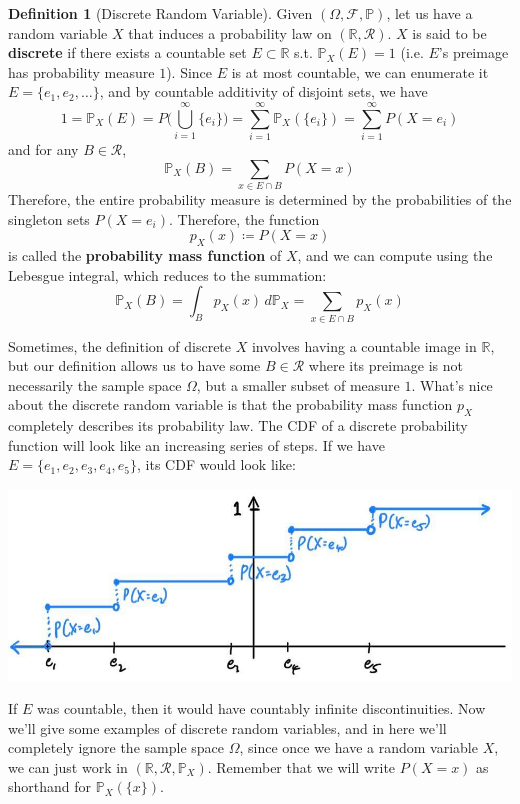 \documentclass{article}
\theoremstyle{definition}
\theoremstyle{remark}
\theoremstyle{definition}
\newtheorem{definition}{Definition}[section]
\begin{document}
\begin{definition}[Discrete Random Variable]
Given $(\Omega, \mathcal{F}, \mathbb{P})$, let us have a random variable $X$ that induces a probability law on $(\mathbb{R}, \mathcal{R})$. $X$ is said to be \textbf{discrete} if there exists a countable set $E \subset \mathbb{R}$ s.t. $\mathbb{P}_X (E) = 1$ (i.e. $E$'s preimage has probability measure $1$). Since $E$ is at most countable, we can enumerate it $E = \{e_1, e_2, \ldots\}$, and by countable additivity of disjoint sets, we have 
\[1 = \mathbb{P}_X (E) = P\bigg( \bigcup_{i=1}^\infty \{e_i\} \bigg) = \sum_{i=1}^\infty \mathbb{P}_X (\{e_i\}) = \sum_{i=1}^\infty P(X = e_i)\]
and for any $B \in \mathcal{R}$,  
\[\mathbb{P}_X (B) = \sum_{x \in E \cap B} P(X = x) \]
Therefore, the entire probability measure is determined by the probabilities of the singleton sets $P(X = e_i)$. Therefore, the function 
\[p_X (x) \coloneqq P(X = x)\]
is called the \textbf{probability mass function} of $X$, and we can compute using the Lebesgue integral, which reduces to the summation: 
\[\mathbb{P}_X (B) = \int_B p_X (x) \, d \mathbb{P}_X = \sum_{x \in E \cap B} p_X (x)\]
\end{definition}

Sometimes, the definition of discrete $X$ involves having a countable image in $\mathbb{R}$, but our definition allows us to have some $B \in \mathcal{R}$ where its preimage is not necessarily the sample space $\Omega$, but a smaller subset of measure $1$. What's nice about the discrete random variable is that the probability mass function $p_X$ completely describes its probability law. The CDF of a discrete probability function will look like an increasing series of steps. If we have $E = \{e_1, e_2, e_3, e_4, e_5\}$, its CDF would look like: 
\begin{center}
    \includegraphics[scale=0.25]{img/Discrete_CDF.jpg}
\end{center}
If $E$ was countable, then it would have countably infinite discontinuities. Now we'll give some examples of discrete random variables, and in here we'll completely ignore the sample space $\Omega$, since once we have a random variable $X$, we can just work in $(\mathbb{R}, \mathcal{R}, \mathbb{P}_X)$. Remember that we will write $P(X = x)$ as shorthand for $\mathbb{P}_X (\{x\})$. 
\end{document}
